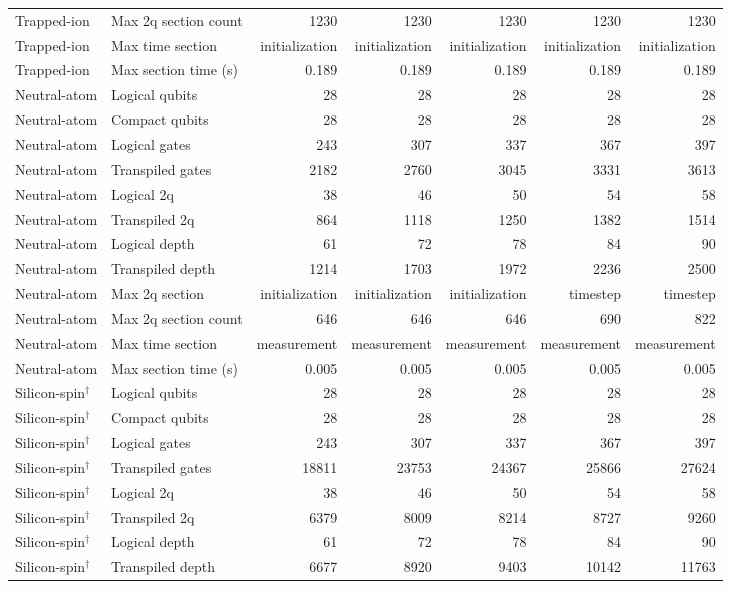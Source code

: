 \begin{table}
\begin{tabular}{llrrrrr}
Trapped-ion & Max 2q section count & 1230 & 1230 & 1230 & 1230 & 1230 \\
Trapped-ion & Max time section & initialization & initialization & initialization & initialization & initialization \\
Trapped-ion & Max section time (s) & 0.189 & 0.189 & 0.189 & 0.189 & 0.189 \\
\hline
Neutral-atom & Logical qubits & 28 & 28 & 28 & 28 & 28 \\
Neutral-atom & Compact qubits & 28 & 28 & 28 & 28 & 28 \\
Neutral-atom & Logical gates & 243 & 307 & 337 & 367 & 397 \\
Neutral-atom & Transpiled gates & 2182 & 2760 & 3045 & 3331 & 3613 \\
Neutral-atom & Logical 2q & 38 & 46 & 50 & 54 & 58 \\
Neutral-atom & Transpiled 2q & 864 & 1118 & 1250 & 1382 & 1514 \\
Neutral-atom & Logical depth & 61 & 72 & 78 & 84 & 90 \\
Neutral-atom & Transpiled depth & 1214 & 1703 & 1972 & 2236 & 2500 \\
Neutral-atom & Max 2q section & initialization & initialization & initialization & timestep & timestep \\
Neutral-atom & Max 2q section count & 646 & 646 & 646 & 690 & 822 \\
Neutral-atom & Max time section & measurement & measurement & measurement & measurement & measurement \\
Neutral-atom & Max section time (s) & 0.005 & 0.005 & 0.005 & 0.005 & 0.005 \\
\hline
Silicon-spin$^{\dagger}$ & Logical qubits & 28 & 28 & 28 & 28 & 28 \\
Silicon-spin$^{\dagger}$ & Compact qubits & 28 & 28 & 28 & 28 & 28 \\
Silicon-spin$^{\dagger}$ & Logical gates & 243 & 307 & 337 & 367 & 397 \\
Silicon-spin$^{\dagger}$ & Transpiled gates & 18811 & 23753 & 24367 & 25866 & 27624 \\
Silicon-spin$^{\dagger}$ & Logical 2q & 38 & 46 & 50 & 54 & 58 \\
Silicon-spin$^{\dagger}$ & Transpiled 2q & 6379 & 8009 & 8214 & 8727 & 9260 \\
Silicon-spin$^{\dagger}$ & Logical depth & 61 & 72 & 78 & 84 & 90 \\
Silicon-spin$^{\dagger}$ & Transpiled depth & 6677 & 8920 & 9403 & 10142 & 11763 \\

\end{tabular}
\end{table}
